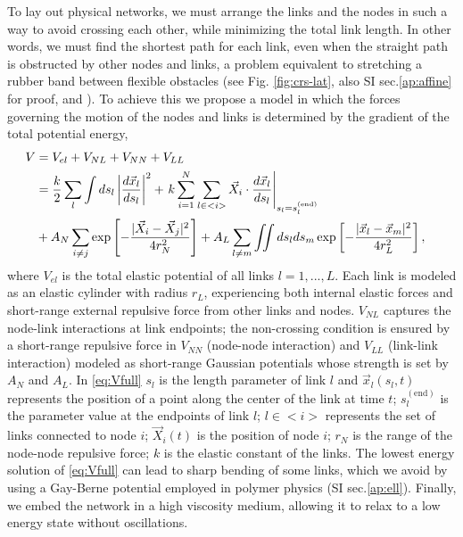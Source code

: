 \documentclass[nofootinbib,preprint,floatfix,titlepage,superscriptaddress]{revtex4} %
\begin{document}
To lay out physical networks, we must arrange the links and the nodes in such a way to avoid crossing each other, while minimizing the total link length. 
In other words, we must find the shortest path for each link, even when the straight path is obstructed by other nodes and links, a problem equivalent to stretching a rubber band between flexible obstacles (see Fig. \ref{fig:crs-lat}, also SI sec.\ref{ap:affine} for proof, and \cite{novikov1984}). 
To achieve this we propose a model in which the forces governing the motion of the nodes and links is determined by the gradient of the total potential energy,  
\begin{align}
    V &= V_{el} + V_{NL} +V_{NN} + V_{LL} \cr 
    &= {k\over 2}\sum_l\int ds_l \left|{d\vec{x}_l\over ds_l} \right|^2 + 
    \left. k\sum_{i=1}^N  \sum_{l\in <i>}  \vec{X}_i \cdot{d\vec{x}_l%
    \over ds_l}\right|_{s_l = s_l^{(\mathrm{end})}}
    \cr
    &+ A_N\sum_{i\ne j}  \exp\left[- {|\vec{X}_i-\vec{X}_j|^2 \over 4r_N^2}\right]+A_L\sum_{l\ne m} \iint ds_lds_m 
    \exp\left[- {|\vec{x}_l-\vec{x}_m|^2 \over 4 r_L^2}\right] ,
 \label{eq:Vfull}
\end{align}
where $V_{el}$ is the total elastic potential of all links $l=1,...,L$. 
Each link is modeled as an elastic cylinder with radius $r_L$, experiencing both internal elastic forces and short-range external repulsive force from other links and nodes. $V_{NL}$ captures the node-link interactions at link endpoints;
the non-crossing condition is ensured by a short-range repulsive force in
$V_{NN}$  (node-node interaction)  and  $V_{LL}$ (link-link interaction) modeled as short-range Gaussian potentials whose strength is set by $A_N$ and $A_L$. 
In \eqref{eq:Vfull} $s_l$ is the length parameter of link $l$ and  $\vec{x}_l(s_l,t)$ represents the position of a point along the center of the link at time $t$;
$s_l^\mathrm{(end)}$ is the parameter value at the endpoints of link $l$;
$l\in <i>$ represents the set of links connected to node $i$; 
$\vec{X}_i(t)$ is the position of node $i$; $r_N$ is the range of the node-node repulsive force; $k$ is the elastic constant of the links.
The lowest energy solution of \eqref{eq:Vfull} can lead to sharp bending of some links, which we avoid by using a Gay-Berne potential  \cite{gay1981modification,berne1972gaussian} employed in polymer physics \citep{everaers2003interaction,babadi2006coarse,mergell2003modeling,cleaver1996extension} (SI sec.\ref{ap:ell}). 
Finally, we embed the network in a high viscosity medium, allowing it to relax to a low energy state without oscillations.
\end{document}
